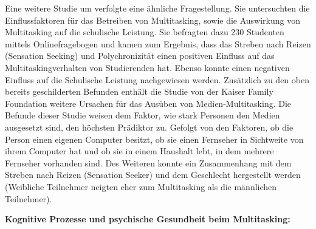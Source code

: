 Eine weitere Studie um  verfolgte eine ähnliche Fragestellung. Sie untersuchten die Einflussfaktoren für das Betreiben von Multitasking, sowie die Auswirkung von Multitasking auf die schulische Leistung. Sie befragten dazu 230 Studenten mittels Onlinefragebogen und kamen zum Ergebnis, dass das Streben nach Reizen (Sensation Seeking) und Polychronizität einen positiven Einfluss auf das Multitaskingverhalten von Studierenden hat. Ebenso konnte einen negativen Einfluss auf die Schulische Leistung nachgewiesen werden. Zusätzlich zu den oben bereits geschilderten Befunden enthält die Studie von  der Kaiser Family Foundation weitere Ursachen für das Ausüben von Medien-Multitasking. Die Befunde dieser Studie weisen dem Faktor, wie stark Personen den Medien ausgesetzt sind, den höchsten Prädiktor zu. Gefolgt von den Faktoren, ob die Person einen eigenen Computer besitzt, ob sie einen Fernseher in Sichtweite von ihrem Computer hat und ob sie in einem Haushalt lebt, in dem mehrere Fernseher vorhanden sind. Des Weiteren konnte ein Zusammenhang mit dem Streben nach Reizen (Sensation Seeker) und dem Geschlecht hergestellt werden (Weibliche Teilnehmer neigten eher zum Multitasking als die männlichen Teilnehmer).
\par
\textbf{Kognitive Prozesse und psychische Gesundheit beim Multitasking:} 
